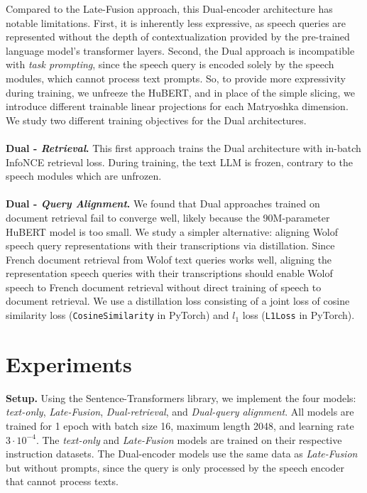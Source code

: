 \documentclass[11pt]{article}
\newcommand{\myparagraph}[1]{\noindent\textbf{#1}}
\begin{document}
Compared to the Late-Fusion approach, this Dual-encoder architecture has notable limitations. First, it is inherently less expressive, as speech queries are represented without the depth of contextualization provided by the pre-trained language model's transformer layers. Second, the Dual approach is incompatible with \textit{task prompting}, since the speech query is encoded solely by the speech modules, which cannot process text prompts. So, to provide more expressivity during training, we unfreeze the HuBERT, and in place of the simple slicing, we introduce different trainable linear projections for each Matryoshka dimension. We study two different training objectives for the Dual architectures.
\\
\\
\myparagraph{Dual - \textit{Retrieval}.} This first approach trains the Dual architecture with in-batch InfoNCE retrieval loss. During training, the text LLM is frozen, contrary to the speech modules which are unfrozen.
\\
\\
\myparagraph{Dual - \textit{Query Alignment}.} We found that Dual approaches trained on document retrieval fail to converge well, likely because the 90M-parameter HuBERT model is too small. We study a simpler alternative: aligning Wolof speech query representations with their transcriptions via distillation. Since French document retrieval from Wolof text queries works well, aligning the representation speech queries with their transcriptions should enable Wolof speech to French document retrieval without direct training of speech to document retrieval. We use a distillation loss consisting of a joint loss of cosine similarity loss (\texttt{CosineSimilarity} in PyTorch) and $l_{1}$ loss (\texttt{L1Loss} in PyTorch).

\section{Experiments}
\myparagraph{Setup.}
Using the Sentence-Transformers library, we implement the four models: \textit{text-only}, \textit{Late-Fusion}, \textit{Dual-retrieval}, and \textit{Dual-query alignment}. All models are trained for 1 epoch with batch size 16, maximum length 2048, and learning rate $3\cdot 10^{-4}$. The \textit{text-only} and \textit{Late-Fusion} models are trained on their respective instruction datasets. The Dual-encoder models use the same data as \textit{Late-Fusion} but without prompts, since the query is only processed by the speech encoder that cannot process texts.
\\
\end{document}
